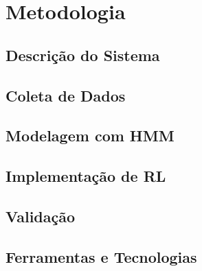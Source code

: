 \section{Metodologia}

\subsection{Descrição do Sistema}

\subsection{Coleta de Dados}

\subsection{Modelagem com HMM}

\subsection{Implementação de RL}

\subsection{Validação}

\subsection{Ferramentas e Tecnologias}
